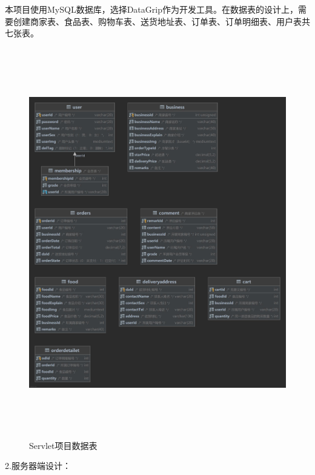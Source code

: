 本项目使用MySQL数据库，选择DataGrip作为开发工具。在数据表的设计上，需要创建商家表、食品表、购物车表、送货地址表、订单表、订单明细表、用户表共七张表。
\begin{figure}[H]
    \centering
    \includegraphics[width=15cm,height=17cm]{figures/table2.jpg}
    \caption{Servlet项目数据表}
    \end{figure}

2.服务器端设计：



